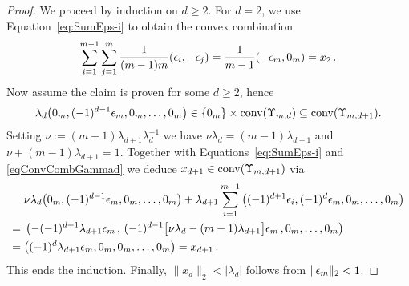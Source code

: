 \begin{proof}
	We proceed by induction on $d \geq 2$. For $d=2$, we use Equation~\eqref{eq:SumEps-i} to obtain the convex combination
	\begin{align*}
		\sum_{i=1}^{m-1} \sum_{j=1}^m \frac{1}{(m-1)m} (\epsilon_i,-\epsilon_j)
		= \frac{1}{m-1} (-\epsilon_m, 0_m) = x_2 \, .
	\end{align*}
	Now assume the claim is proven for some $d \geq 2$, hence
	\begin{equation}\label{eqConvCombGammad}
		\lambda_d \big( 0_m, (-1)^{d-1} \epsilon_m, 0_m, \ldots, 0_m \big) \in \lbrace 0_m \rbrace \times \operatorname{conv}(\Upsilon_{m,d}) \subseteq \operatorname{conv}(\Upsilon_{m,d+1}).
	\end{equation}
	Setting $\nu := (m-1)\lambda_{d+1} \lambda_d^{-1}$
	we have $\nu \lambda_d = (m-1)\lambda_{d+1}$ and $\nu + (m-1)\lambda_{d+1} = 1$. Together with Equations~\eqref{eq:SumEps-i} and \eqref{eqConvCombGammad} we deduce $x_{d+1} \in \operatorname{conv}(\Upsilon_{m,d+1})$ via
	\begin{align*}
		&\nu \lambda_d \big( 0_m,(-1)^{d-1} \epsilon_m, 0_m,\ldots,0_m \big) + \lambda_{d+1} \sum_{i=1}^{m-1} \big( (-1)^{d+1} \epsilon_i,(-1)^{d}\epsilon_m,0_m,\ldots,0_m \big) \\
		= \; &\left( -(-1)^{d+1} \lambda_{d+1} \epsilon_m \, , \, (-1)^{d-1} \big[\nu \lambda_d - (m-1)\lambda_{d+1} \big] \epsilon_m \, , 0_m,\ldots,0_m \right) \\
		= \; &\big( (-1)^d \lambda_{d+1} \epsilon_m,0_m,0_m,\ldots,0_m \big) = x_{d+1} \, .
	\end{align*}
	This ends the induction. Finally, $\|x_d\|_2 < \vert \lambda_d \vert$ follows from $\|\epsilon_m\|_2 < 1$.
\end{proof}


